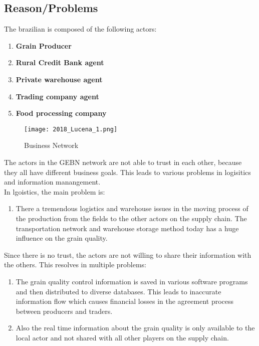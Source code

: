 \subsection*{Reason/Problems}
The brazilian  is composed of the following actors:
\begin{enumerate}[label={\arabic*)},font={\color{red!50!black}\bfseries},noitemsep]
	\item \textbf{Grain Producer}
	\item \textbf{Rural Credit Bank agent}
	\item \textbf{Private warehouse agent}
	\item \textbf{Trading company agent}
	\item \textbf{Food processing company}
\end{enumerate}
\begin{figure}[!ht]
    \centering
    \label{fig:2018_Lucena_Implementation_Business}
    \caption{Business Network}
    \texttt{[image: 2018\_Lucena\_1.png]}
\end{figure}
The actors in the GEBN network are not able to trust in each other, because they all have different business goals. This leads to various problems in logisitics and information manangement.\\
In lgoistics, the main problem is:
\begin{enumerate}[label={\arabic*)},font={\color{red!50!black}\bfseries},noitemsep]
	\item There a tremendous logistics and warehouse issues in the moving process of the production from the fields to the other actors on the supply chain. The transportation network and warehouse storage method today has a huge influence on the grain quality.
\end{enumerate}
Since there is no trust, the actors are not willing to share their information with the others. This resolves in multiple problems:
\begin{enumerate}[label={\arabic*)},font={\color{red!50!black}\bfseries},noitemsep]
	\item The grain quality control information is saved in various software programs and then distributed to diverse databases. This leads to inaccurate information flow which causes financial losses in the agreement process between producers and traders.
	\item  Also the real time information about the grain quality is only available to the local actor and not shared with all other players on the supply chain.
\end{enumerate}

